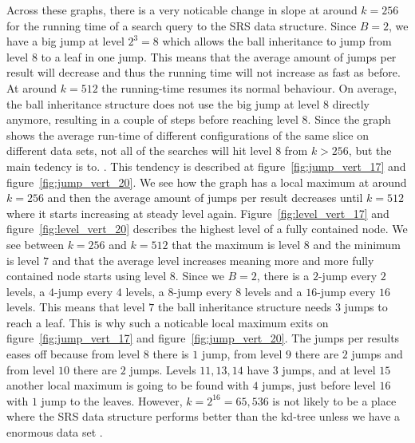 Across these graphs, there is a very noticable change in slope at around $k=256$ for the running time of a search query to the SRS data structure. Since $B=2$, we have a big jump at level $2^3 = 8$ which allows the ball inheritance to jump from level $8$ to a leaf in one jump. This means that the average amount of jumps per result will decrease and thus the running time will not increase as fast as before. At around $k=512$ the running-time resumes its normal behaviour. On average, the ball inheritance structure does not use the big jump at level $8$ directly anymore, resulting in a couple of steps before reaching level $8$. Since the graph shows the average run-time of different configurations of the same slice on different data sets, not all of the searches will hit level $8$ from $k>256$, but the main tedency is to. . This tendency is described at figure~\ref{fig:jump_vert_17} and figure~\ref{fig:jump_vert_20}. We see how the graph has a local maximum at around $k=256$ and then the average amount of jumps per result decreases until $k=512$ where it starts increasing at steady level again. Figure~\ref{fig:level_vert_17} and figure~\ref{fig:level_vert_20} describes the highest level of a fully contained node. We see between $k=256$ and $k=512$ that the maximum is level $8$ and the minimum is level $7$ and that the average level increases meaning more and more fully contained node starts using level $8$. Since we $B=2$, there is a $2$-jump every $2$ levels, a $4$-jump every $4$ levels, a $8$-jump every $8$ levels and a $16$-jump every $16$ levels. This means that level $7$ the ball inheritance structure needs $3$ jumps to reach a leaf. This is why such a noticable local maximum exits on figure~\ref{fig:jump_vert_17} and figure~\ref{fig:jump_vert_20}. The jumps per results eases off because from level $8$ there is $1$ jump, from level $9$ there are $2$ jumps and from level $10$ there are $2$ jumps. Levels $11, 13, 14$ have $3$ jumps, and at level $15$ another local maximum is going to be found with $4$ jumps, just before level $16$ with $1$ jump to the leaves. However, $k=2^{16}=65,536$ is not likely to be a place where the SRS data structure performs better than the kd-tree unless we have a enormous data set . 

